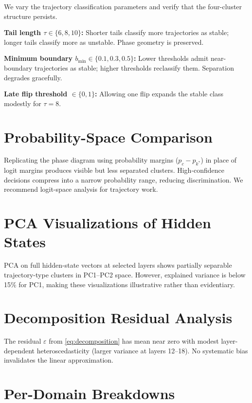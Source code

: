 \documentclass{article}
\begin{document}
We vary the trajectory classification parameters and verify that the four-cluster structure persists.

\textbf{Tail length $\tau \in \{6, 8, 10\}$:}  Shorter tails classify more trajectories as stable; longer tails classify more as unstable.  Phase geometry is preserved.

\textbf{Minimum boundary $b_{\min} \in \{0.1, 0.3, 0.5\}$:}  Lower thresholds admit near-boundary trajectories as stable; higher thresholds reclassify them.  Separation degrades gracefully.

\textbf{Late flip threshold $\in \{0, 1\}$:}  Allowing one flip expands the stable class modestly for $\tau = 8$.

\section{Probability-Space Comparison}
\label{sec:appendix_prob}

Replicating the phase diagram using probability margins ($p_c - p_{k^*}$) in place of logit margins produces visible but less separated clusters.  High-confidence decisions compress into a narrow probability range, reducing discrimination.  We recommend logit-space analysis for trajectory work.

\section{PCA Visualizations of Hidden States}
\label{sec:appendix_pca}

PCA on full hidden-state vectors at selected layers shows partially separable trajectory-type clusters in PC1--PC2 space.  However, explained variance is below 15\% for PC1, making these visualizations illustrative rather than evidentiary.

\section{Decomposition Residual Analysis}

The residual $\varepsilon$ from \cref{eq:decomposition} has mean near zero with modest layer-dependent heteroscedasticity (larger variance at layers 12--18).  No systematic bias invalidates the linear approximation.

\section{Per-Domain Breakdowns}
\end{document}
